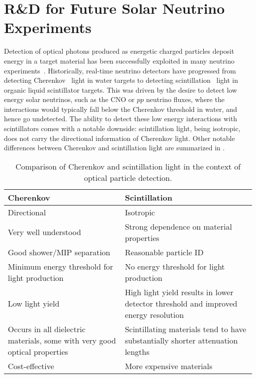 \chapter{R\&D for Future Solar Neutrino Experiments}
\label{ch:wbls}

Detection of optical photons produced as energetic charged particles deposit energy in a target material has been successfully exploited in many neutrino experiments~\cite{imb,superk,sno,kamland,borexino,lsnd}.
Historically, real-time neutrino detectors have progressed from detecting Cherenkov~\cite{cherenkov} light in water targets to detecting scintillation~\cite{birks} light in organic liquid scintillator targets.
This was driven by the desire to detect low energy solar neutrinos, such as the CNO or $pp$ neutrino fluxes, where the interactions would typically fall below the Cherenkov threshold in water, and hence go undetected.
The ability to detect these low energy interactions with scintillators comes with a notable downside: scintillation light, being isotropic, does not carry the directional information of Cherenkov light.
Other notable differences between Cherenkov and scintillation light are summarized in .

\begin{table}[]
\begin{tabularx}{\textwidth}{CC}
Cherenkov & Scintillation \\
\hline
\hline
Directional & Isotropic\\
\hline
Very well understood  & Strong dependence on material properties  \\
\hline
Good shower/MIP separation & Reasonable particle ID  \\
\hline
Minimum energy threshold for light production & No energy threshold for light production  \\
\hline
Low light yield & High light yield results in lower detector threshold and improved energy resolution \\
\hline
Occurs in all dielectric materials, some with very good optical properties & Scintillating materials tend to have substantially shorter attenuation lengths  \\
\hline
Cost-effective & More expensive materials \\
\end{tabularx}
\caption{Comparison of Cherenkov and scintillation light in the context of optical particle detection.}
\label{tab:chervsscint}
\end{table}

